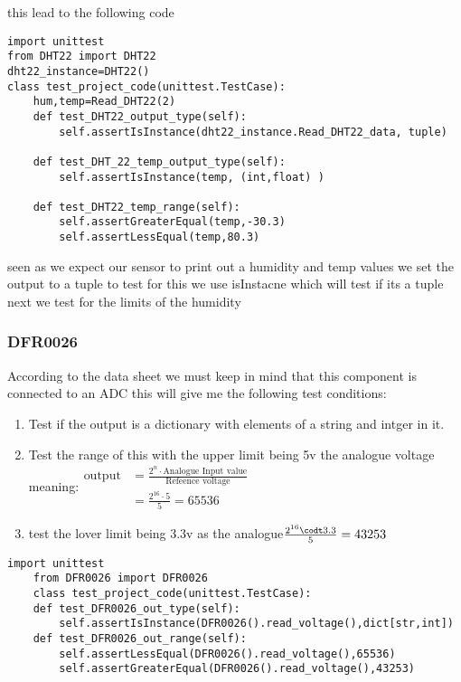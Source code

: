 this lead to the  following code 
\begin{lstlisting}[style=mystyle,caption={sample test for DHT22}]
import unittest
from DHT22 import DHT22
dht22_instance=DHT22()
class test_project_code(unittest.TestCase):
    hum,temp=Read_DHT22(2)
    def test_DHT22_output_type(self):
        self.assertIsInstance(dht22_instance.Read_DHT22_data, tuple)

    def test_DHT_22_temp_output_type(self):
        self.assertIsInstance(temp, (int,float) )

    def test_DHT22_temp_range(self):
        self.assertGreaterEqual(temp,-30.3)
        self.assertLessEqual(temp,80.3)
\end{lstlisting}
seen as we expect our sensor to  print out a humidity and temp values we  set the  output to  a tuple 
to test for this we use isInstacne which will test if its a tuple
next we test for the  limits of the  humidity
\subsubsection{DFR0026}
According to the  data sheet \cite{ada} we must keep in mind  that this  component is  connected to  an ADC 
this  will  give  me  the  following  test conditions:
\begin{enumerate}
    \item Test if  the output is a dictionary with elements of a string and intger in it.

    \item Test  the  range of this  with the  upper limit being 5v the analogue voltage meaning:$\begin{aligned}\text{output}&= \frac{2^n\cdot \text{Analogue Input value}}{\text{Refeence voltage}}\\ &=\frac{2^{16}\cdot 5}{5}=65536\end{aligned}$
    \item test the  lover limit being 3.3v as the analogue$\frac{2^{16}\codt 3.3}{5}=43253$
\end{enumerate}
\begin{lstlisting}[style=mystyle,caption={unit test for  DFR0026 and  MCP3008}]
    import unittest
    from DFR0026 import DFR0026
    class test_project_code(unittest.TestCase):
    def test_DFR0026_out_type(self):
        self.assertIsInstance(DFR0026().read_voltage(),dict[str,int])
    def test_DFR0026_out_range(self):
        self.assertLessEqual(DFR0026().read_voltage(),65536)
        self.assertGreaterEqual(DFR0026().read_voltage(),43253)
\end{lstlisting}
